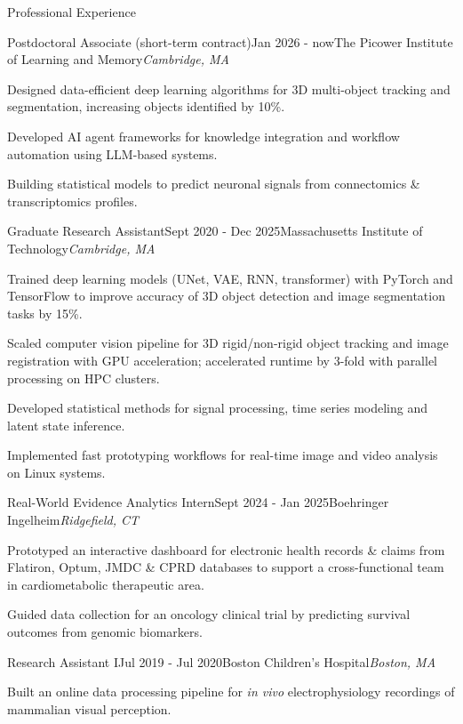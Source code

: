 \documentclass{resume} %
\begin{document}
\begin{rSection}{Professional Experience}
\begin{rSubsection}{Postdoctoral Associate (short-term contract)}{Jan 2026 - now}{The Picower Institute of Learning and Memory}{\textit{Cambridge, MA}}
    \item Designed data-efficient deep learning algorithms for 3D multi-object tracking and segmentation, increasing objects identified by 10\%.
    \item Developed AI agent frameworks for knowledge integration and workflow automation using LLM-based systems.    
    \item Building statistical models to predict neuronal signals from connectomics \& transcriptomics profiles.
\end{rSubsection}

\begin{rSubsection}{Graduate Research Assistant}{Sept 2020 - Dec 2025}{Massachusetts Institute of Technology}{\textit{Cambridge, MA}}
  \item Trained deep learning models (UNet, VAE, RNN, transformer) with PyTorch and TensorFlow to improve accuracy of 3D object detection and image segmentation tasks by 15\%.
  \item Scaled computer vision pipeline for 3D rigid/non-rigid object tracking and image registration with GPU acceleration; accelerated runtime by 3-fold with parallel processing on HPC clusters.
  \item Developed statistical methods for signal processing, time series modeling and latent state inference.
  \item Implemented fast prototyping workflows for real-time image and video analysis on Linux systems.
\end{rSubsection}

\begin{rSubsection}{Real-World Evidence Analytics Intern}{Sept 2024 - Jan 2025}{Boehringer Ingelheim}{\textit{Ridgefield, CT}}
  \item Prototyped an interactive dashboard for electronic health records \& claims from Flatiron, Optum, JMDC \& CPRD databases to support a cross-functional team in cardiometabolic therapeutic area.
  \item Guided data collection for an oncology clinical trial by predicting survival outcomes from genomic biomarkers.  
\end{rSubsection}

\begin{rSubsection}{Research Assistant I}{Jul 2019 - Jul 2020}{Boston Children's Hospital}{\textit{Boston, MA}}
  \item Built an online data processing pipeline for \textit{in vivo} electrophysiology recordings of mammalian visual perception.
\end{rSubsection}


\end{rSection}
\end{document}
